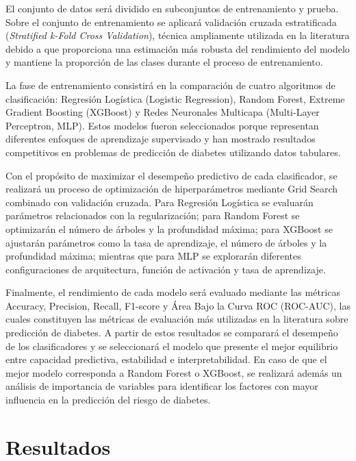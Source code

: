 \documentclass[journal]{IEEEtran}
\begin{document}
El conjunto de datos será dividido en subconjuntos de entrenamiento y prueba. Sobre el conjunto de entrenamiento se aplicará validación cruzada estratificada (\textit{Stratified k-Fold Cross Validation}), técnica ampliamente utilizada en la literatura debido a que proporciona una estimación más robusta del rendimiento del modelo y mantiene la proporción de las clases durante el proceso de entrenamiento.

La fase de entrenamiento consistirá en la comparación de cuatro algoritmos de clasificación: Regresión Logística (Logistic Regression), Random Forest, Extreme Gradient Boosting (XGBoost) y Redes Neuronales Multicapa (Multi-Layer Perceptron, MLP). Estos modelos fueron seleccionados porque representan diferentes enfoques de aprendizaje supervisado y han mostrado resultados competitivos en problemas de predicción de diabetes utilizando datos tabulares.

Con el propósito de maximizar el desempeño predictivo de cada clasificador, se realizará un proceso de optimización de hiperparámetros mediante Grid Search combinado con validación cruzada. Para Regresión Logística se evaluarán parámetros relacionados con la regularización; para Random Forest se optimizarán el número de árboles y la profundidad máxima; para XGBoost se ajustarán parámetros como la tasa de aprendizaje, el número de árboles y la profundidad máxima; mientras que para MLP se explorarán diferentes configuraciones de arquitectura, función de activación y tasa de aprendizaje.

Finalmente, el rendimiento de cada modelo será evaluado mediante las métricas Accuracy, Precision, Recall, F1-score y Área Bajo la Curva ROC (ROC-AUC), las cuales constituyen las métricas de evaluación más utilizadas en la literatura sobre predicción de diabetes. A partir de estos resultados se comparará el desempeño de los clasificadores y se seleccionará el modelo que presente el mejor equilibrio entre capacidad predictiva, estabilidad e interpretabilidad. En caso de que el mejor modelo corresponda a Random Forest o XGBoost, se realizará además un análisis de importancia de variables para identificar los factores con mayor influencia en la predicción del riesgo de diabetes.




\section{Resultados}
\end{document}
